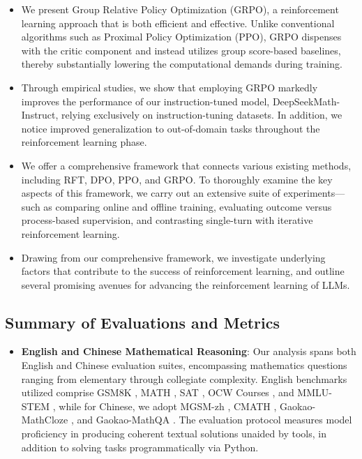 \begin{itemize}[topsep=0pt]
\begin{itemize}[topsep=0pt]
    \item We present Group Relative Policy Optimization (GRPO), a reinforcement learning approach that is both efficient and effective. Unlike conventional algorithms such as Proximal Policy Optimization (PPO), GRPO dispenses with the critic component and instead utilizes group score-based baselines, thereby substantially lowering the computational demands during training.
    \item Through empirical studies, we show that employing GRPO markedly improves the performance of our instruction-tuned model, DeepSeekMath-Instruct, relying exclusively on instruction-tuning datasets. In addition, we notice improved generalization to out-of-domain tasks throughout the reinforcement learning phase.
    \item We offer a comprehensive framework that connects various existing methods, including RFT, DPO, PPO, and GRPO. To thoroughly examine the key aspects of this framework, we carry out an extensive suite of experiments—such as comparing online and offline training, evaluating outcome versus process-based supervision, and contrasting single-turn with iterative reinforcement learning.
    \item Drawing from our comprehensive framework, we investigate underlying factors that contribute to the success of reinforcement learning, and outline several promising avenues for advancing the reinforcement learning of LLMs.
\end{itemize}

\subsection{Summary of Evaluations and Metrics}

\begin{itemize}[topsep=0pt]
    \item \textbf{English and Chinese Mathematical Reasoning}: Our analysis spans both English and Chinese evaluation suites, encompassing mathematics questions ranging from elementary through collegiate complexity. English benchmarks utilized comprise GSM8K \citep{gsm8k}, MATH \citep{MATH}, SAT \citep{llemma}, OCW Courses \citep{minerva}, and MMLU-STEM \citep{mmlu}, while for Chinese, we adopt MGSM-zh \citep{mgsm}, CMATH \citep{wei2023cmath}, Gaokao-MathCloze \citep{agieval}, and Gaokao-MathQA \citep{agieval}. The evaluation protocol measures model proficiency in producing coherent textual solutions unaided by tools, in addition to solving tasks programmatically via Python.


\end{itemize}
\end{itemize}
